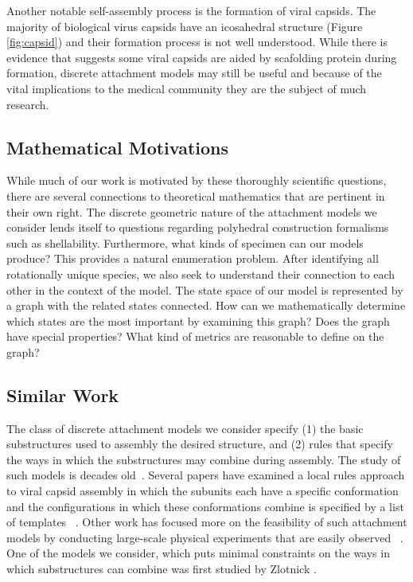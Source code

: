 \documentclass[12pt]{article}
\begin{document}
Another notable self-assembly process is the formation of viral capsids. The majority of biological virus capsids have an icosahedral structure (Figure \ref{fig:capsid}) and their formation process is not well understood. While there is evidence that suggests some viral capsids are aided by scafolding protein during formation, discrete attachment models may still be useful and because of the vital implications to the medical community they are the subject of much research. 


\subsection{Mathematical Motivations}
While much of our work is motivated by these thoroughly scientific questions, there are several connections to theoretical mathematics that are pertinent in their own right. The discrete geometric nature of the attachment models we consider lends itself to questions regarding polyhedral construction formalisms such as shellability. Furthermore, what kinds of specimen can our models produce? This provides a natural enumeration problem. After identifying all rotationally unique species, we also seek to understand their connection to each other in the context of the model. The state space of our model is represented by a graph with the related states connected. How can we mathematically determine which states are the most important by examining this graph? Does the graph have special properties? What kind of metrics are reasonable to define on the graph? 

\subsection{Similar Work}

The class of discrete attachment models we consider specify (1) the basic substructures used to assembly the desired structure, and (2) rules that specify the ways in which the substructures may combine during assembly. The study of such models is decades old~\cite{Eden1961}. Several papers have examined a local rules approach to viral capsid assembly in which the subunits each have a specific conformation and the configurations in which these conformations combine is specified by a list of templates ~\cite{Berger1994,Schwartz1998,Hagan2006,Grayson2012}. Other work has focused more on the feasibility of such attachment models by conducting large-scale physical experiments that are easily observed ~\cite{Hosokawa1994,Bishop2005,Klavins2006}. One of the models we consider, which puts minimal constraints on the ways in which substructures can combine was first studied by Zlotnick \cite{Zlotnick1994,Endres2005}.
\end{document}
